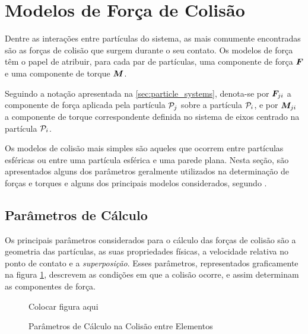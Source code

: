 \section{Modelos de Força de Colisão} \label{sec:collision_force_models}

Dentre as interações entre partículas do sistema, as mais comumente encontradas são as forças de colisão que surgem durante o seu contato. Os modelos de força têm o papel de atribuir, para cada par de partículas, uma componente de força \(\bm{F}\) e uma componente de torque \(\bm{M}\).

Seguindo a notação apresentada na \autoref{sec:particle_systems}, denota-se por \({\bm{F}}_{j i}\) a componente de força aplicada pela partícula \(\particlej\) sobre a partícula \(\particlei\), e por \({\bm{M}}_{j i}\) a componente de torque correspondente definida no sistema de eixos centrado na partícula \(\particlei\).

Os modelos de colisão mais simples são aqueles que ocorrem entre partículas esféricas ou entre uma partícula esférica e uma parede plana. Nesta seção, são apresentados alguns dos parâmetros geralmente utilizados na determinação de forças e torques e alguns dos principais modelos considerados, segundo . 

\subsection{Parâmetros de Cálculo} \label{subsec:collision_parameters}

Os principais parâmetros considerados para o cálculo das forças de colisão são a geometria das partículas, as suas propriedades físicas, a velocidade relativa no ponto de contato e a \textit{superposição}. Esses parâmetros, representados graficamente na figura \ref{fig:collision_parameters}, descrevem as condições em que a colisão ocorre, e assim determinam as componentes de força.

\begin{figure}[h]
	\caption{Parâmetros de Cálculo na Colisão entre Elementos}
	\centering
		\alert{Colocar figura aqui}
	\label{fig:collision_parameters}
\end{figure}

